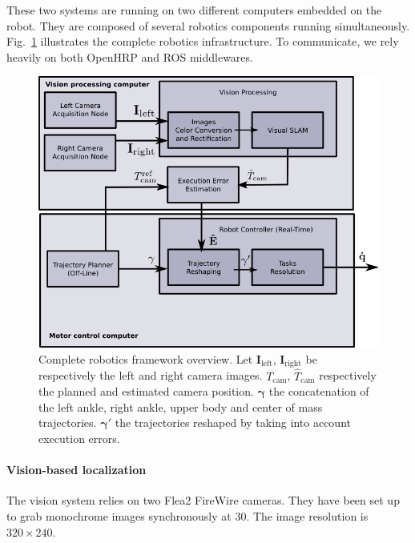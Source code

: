 These two systems are running on two different computers embedded on
the robot. They are composed of several robotics components running
simultaneously. Fig.~\ref{fig:framework_overview} illustrates the
complete robotics infrastructure. To communicate, we rely heavily on
both OpenHRP and ROS middlewares.
%
\begin{figure}[ht!]
  \begin{center}
    \includegraphics[width=\linewidth]{images/rss_framework.png}
  \end{center}
  \caption{Complete robotics framework overview. Let
    $\mathbf{I}_{\text{left}}$, $\mathbf{I}_{\text{right}}$ be
    respectively the left and right camera
    images. $\mathit{T}_{\text{cam}}$, $\mathit{\hat{T}}_{\text{cam}}$
    respectively the planned and estimated camera
    position. $\mathbf{\gamma}$ the concatenation of the left ankle,
    right ankle, upper body and center of mass
    trajectories. $\mathbf{\gamma'}$ the trajectories reshaped by
    taking into account execution
    errors.\label{fig:framework_overview}}
\end{figure}

\paragraph{Vision-based localization}

The vision system relies on two Flea2 FireWire cameras. They have been
set up to grab monochrome images synchronously at 30\hertz. The image
resolution is $320 \times 240$.

